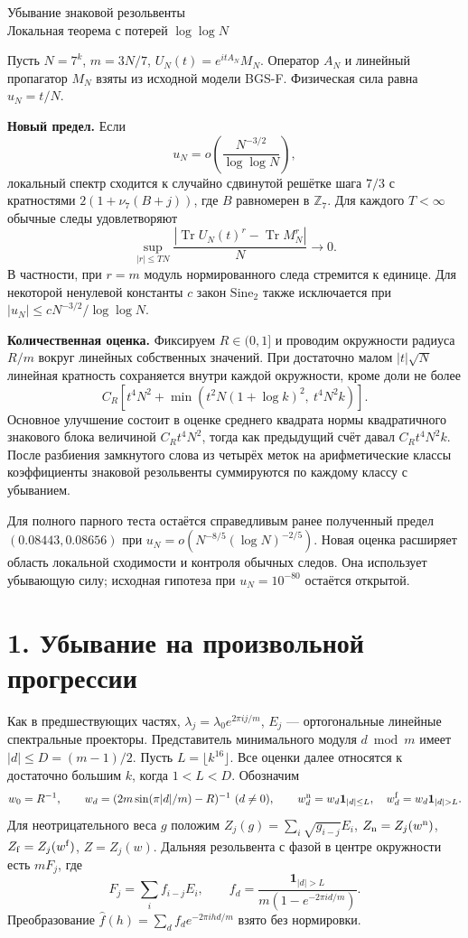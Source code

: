 \documentclass[11pt,a4paper]{article}
\newcommand{\Tr}{\operatorname{Tr}}
\newcommand{\si}{\mathrm{Sine}_2}
\newcommand{\sect}[1]{\section*{\sffamily\color{ink}#1}}
\newcommand{\subt}[1]{\par\medskip\noindent\textbf{#1.}\quad}
\newcommand{\Zp}{\mathbb Z_7}
\begin{document}
\begin{center}{\LARGE\sffamily Убывание знаковой резольвенты}\\[4pt]
{\large Локальная теорема с потерей \(\log\log N\)}
\end{center}
Пусть \(N=7^k\), \(m=3N/7\), \(U_N(t)=e^{itA_N}M_N\). Оператор \(A_N\) и линейный пропагатор \(M_N\) взяты из исходной модели BGS-F. Физическая сила равна \(u_N=t/N\).

\subt{Новый предел}
Если
\[
                    u_N=o\!\left(\frac{N^{-3/2}}{\log\log N}\right),
\]
локальный спектр сходится к случайно сдвинутой решётке шага \(7/3\) с кратностями \(2(1+\nu_7(B+j))\), где \(B\) равномерен в \(\Zp\). Для каждого \(T<\infty\) обычные следы удовлетворяют
\[
    \sup_{|r|\le TN}\frac{|\Tr U_N(t)^r-\Tr M_N^r|}{N}\longrightarrow0 .
\]
В частности, при \(r=m\) модуль нормированного следа стремится к единице. Для некоторой ненулевой константы \(c\) закон \(\si\) также исключается при \(|u_N|\le cN^{-3/2}/\log\log N\).

\subt{Количественная оценка}
Фиксируем \(R\in(0,1]\) и проводим окружности радиуса \(R/m\) вокруг линейных собственных значений. При достаточно малом \(|t|\sqrt N\) линейная кратность сохраняется внутри каждой окружности, кроме доли не более
\[
    C_R\left[t^4N^2+\min\left(t^2N(1+\log k)^2,\ t^4N^2k\right)\right].
\]
Основное улучшение состоит в оценке среднего квадрата нормы квадратичного знакового блока величиной \(C_Rt^4N^2\), тогда как предыдущий счёт давал \(C_Rt^4N^2k\). После разбиения замкнутого слова из четырёх меток на арифметические классы коэффициенты знаковой резольвенты суммируются по каждому классу с убыванием.

Для полного парного теста остаётся справедливым ранее полученный предел \((0.08443,0.08656)\) при \(u_N=o(N^{-8/5}(\log N)^{-2/5})\). Новая оценка расширяет область локальной сходимости и контроля обычных следов. Она использует убывающую силу; исходная гипотеза при \(u_N=10^{-80}\) остаётся открытой.
\newpage
\sect{1. Убывание на произвольной прогрессии}
Как в предшествующих частях, \(\lambda_j=\lambda_0e^{2\pi i j/m}\), \(E_j\) --- ортогональные линейные спектральные проекторы. Представитель минимального модуля \(d\bmod m\) имеет \(|d|\le D=(m-1)/2\). Пусть \(L=\lfloor k^{16}\rfloor\). Все оценки далее относятся к достаточно большим \(k\), когда \(1<L<D\). Обозначим
\[
 w_0=R^{-1},\qquad w_d=(2m\sin(\pi |d|/m)-R)^{-1}\ (d\ne0),\qquad
 w^{\rm n}_d=w_d\mathbf1_{|d|\le L},\quad
 w^{\rm f}_d=w_d\mathbf1_{|d|>L}.
\]
Для неотрицательного веса \(g\) положим \(Z_j(g)=\sum_i\sqrt{g_{i-j}}E_i\), \(Z_{\rm n}=Z_j(w^{\rm n})\), \(Z_{\rm f}=Z_j(w^{\rm f})\), \(Z=Z_j(w)\). Дальняя резольвента с фазой в центре окружности есть \(mF_j\), где
\[
             F_j=\sum_i f_{i-j}E_i,\qquad
       f_d=\frac{\mathbf1_{|d|>L}}{m(1-e^{-2\pi i d/m})}.
\]
Преобразование \(\widehat f(h)=\sum_df_d e^{-2\pi i hd/m}\) взято без нормировки.
\end{document}
